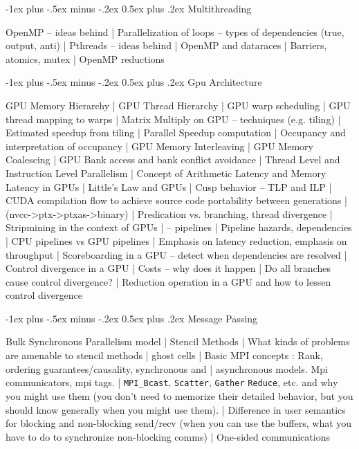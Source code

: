 \documentclass[letter,8pt,landscape]{article}
\makeatletter
\renewcommand{\section}{\@startsection{section}{1}{0mm}%
                                {-1ex plus -.5ex minus -.2ex}%
                                {0.5ex plus .2ex}%
                                {\normalfont\large\bfseries}}
\makeatother
\begin{document}
\begin{multicols}{3}
  \section{Multithreading}

  OpenMP – ideas behind |
  Parallelization of loops – types of dependencies (true, output, anti) |
  Pthreads – ideas behind |
  OpenMP and dataraces |
  Barriers, atomics, mutex |
  OpenMP reductions

  \section{Gpu Architecture}

  GPU Memory Hierarchy |
  GPU Thread Hierarchy |
  GPU warp scheduling |
  GPU thread mapping to warps |
  Matrix Multiply on GPU – techniques (e.g. tiling) |
  Estimated speedup from tiling |
  Parallel Speedup computation |
  Occupancy and interpretation of occupancy |
  GPU Memory Interleaving |
  GPU Memory Coalescing |
  GPU Bank access and bank conflict avoidance |
  Thread Level and Instruction Level Parallelism |
  Concept of Arithmetic Latency and Memory Latency in GPUs |
  Little’s Law and GPUs |
  Cusp behavior – TLP and ILP |
  CUDA compilation flow to achieve source code portability between generations |
  (nvcc->ptx->ptxas->binary) |
  Predication vs. branching, thread divergence |
  Stripmining in the context of GPUs |
  – pipelines |
  Pipeline hazards, dependencies  |
  CPU pipelines vs GPU pipelines |
  Emphasis on latency reduction, emphasis on throughput |
  Scoreboarding in a GPU – detect when dependencies are resolved |
  Control divergence in a GPU |
  Costs – why does it happen |
  Do all branches cause control divergence? |
  Reduction operation in a GPU and how to lessen control divergence

  \section{Message Passing}

  Bulk Synchronous Parallelism model |
  Stencil Methods |
  What kinds of problems are amenable to stencil methods |
  ghost cells |
  Basic MPI concepts : Rank, ordering guarantees/causality, synchronous and  |
  asynchronous models. Mpi communicators, mpi tags. |
  \verb|MPI_Bcast|, \verb|Scatter|, \verb|Gather| \verb|Reduce|, etc.  and why you might use them (you don’t 
  need to memorize their detailed behavior, but you should know generally when 
  you might use them). |
  Difference in user semantics for blocking and non-blocking send/recv (when you
  can use the buffers, what you have to do to synchronize non-blocking comms) |
  One-sided communications


\end{multicols}
\end{document}
